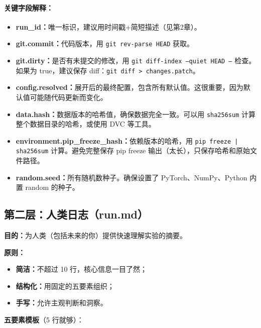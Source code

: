\paragraph{关键字段解释：}

\begin{itemize}
  \item \textbf{run\_id：}唯一标识，建议用时间戳+简短描述（见第2章）。

  \item \textbf{git.commit：}代码版本，用 \texttt{git rev-parse HEAD} 获取。

  \item \textbf{git.dirty：}是否有未提交的修改，用 \texttt{git diff-index --quiet HEAD --} 检查。如果为 true，建议保存 diff：\texttt{git diff > changes.patch}。

  \item \textbf{config.resolved：}展开后的最终配置，包含所有默认值。这很重要，因为默认值可能随代码更新而变化。

  \item \textbf{data.hash：}数据版本的哈希值，确保数据完全一致。可以用 \texttt{sha256sum} 计算整个数据目录的哈希，或使用 DVC 等工具。

  \item \textbf{environment.pip\_freeze\_hash：}依赖版本的哈希，用 \texttt{pip freeze | sha256sum} 计算。避免完整保存 pip freeze 输出（太长），只保存哈希和原始文件路径。

  \item \textbf{random.seed：}所有随机数种子。确保设置了 PyTorch、NumPy、Python 内置 random 的种子。
\end{itemize}

\subsection{第二层：人类日志（run.md）}

\textbf{目的：}为人类（包括未来的你）提供快速理解实验的摘要。

\textbf{原则：}
\begin{itemize}
  \item \textbf{简洁：}不超过 10 行，核心信息一目了然；
  \item \textbf{结构化：}用固定的五要素组织；
  \item \textbf{手写：}允许主观判断和洞察。
\end{itemize}

\textbf{五要素模板}（5 行就够）：

